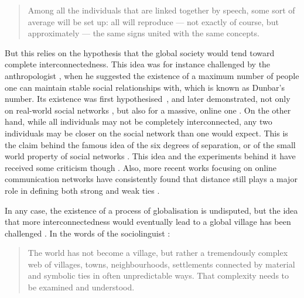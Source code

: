 \documentclass[../thesis.tex]{subfiles}
\begin{document}
\begin{quote}
  Among all the individuals that are linked together by speech, some sort of average
  will be set up: all will reproduce --- not exactly of course, but approximately ---
  the same signs united with the same concepts. \cite{deSaussureCourseGeneral2011}
\end{quote}


But this relies on the hypothesis that the global
society would tend toward complete interconnectedness. This idea was for instance
challenged by the anthropologist , when he
suggested the existence of a maximum number of people one can maintain stable social
relationships with, which is known as Dunbar's number. Its existence was first
hypothesised~\cite{DunbarNeocortexSize1992,DunbarSocialBrain1998}, and later
demonstrated, not only on real-world social networks
\cite{HillSocialNetwork2003,McCartyComparingTwo2005}, but also for a massive, online one
\cite{GoncalvesModelingUsers2011}.
On the other hand, while all individuals may not be completely interconnected, any two
individuals may be closer on the social network than one would expect. This is the claim
behind the famous idea of the six degrees of separation, or of the small world property
of social networks
\cite{deSolaPoolContactsInfluence1978,MilgramSmallWorld1967,TraversExperimentalStudy1977a,WattsCollectiveDynamics1998}.
This idea and the experiments behind it have received some criticism though
\cite{KleinfeldSmallWorld2002}. Also, more recent works focusing on online communication
networks have consistently found that distance still plays a major role in defining both
strong and weak ties
\cite{LeskovecPlanetaryscaleViews2008,TakhteyevGeographyTwitter2012a,Garcia-GavilanesTwitterAin2014}. 

In any case, the existence of a process of globalisation is undisputed, but the idea that more
interconnectedness would eventually lead to a global village has been challenged
\cite{NorrisCosmopolitanCommunications2009,BlommaertSociolinguisticsGlobalization2010}.
In the words of the sociolinguist
:

\begin{quote}
  The world has not become a village, but rather a tremendously complex web of villages,
  towns, neighbourhoods, settlements connected by material and symbolic ties in often
  unpredictable ways. That complexity needs to be examined and understood.
  \cite{BlommaertSociolinguisticsGlobalization2010}
\end{quote}
 
\end{document}
